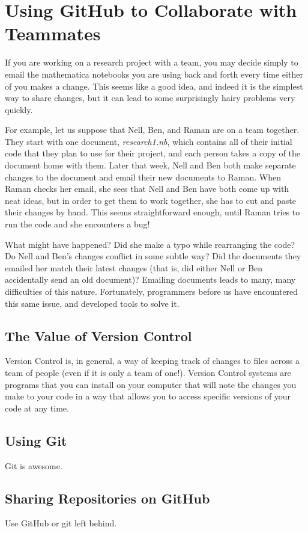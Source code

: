 \chapter{Using GitHub to Collaborate with Teammates}

If you are working on a research project with a team, you may decide simply to email the mathematica notebooks you are using back and forth every time either of you makes a change. This seems like a good idea, and indeed it is the simplest way to share changes, but it can lead to some surprisingly hairy problems very quickly.

For example, let us suppose that Nell, Ben, and Raman are on a team together. They start with one document, \emph{research1.nb}, which contains all of their initial code that they plan to use for their project, and each person takes a copy of the document home with them. Later that week, Nell and Ben both make separate changes to the document and email their new documents to Raman. When Raman checks her email, she sees that Nell and Ben have both come up with neat ideas, but in order to get them to work together, she has to cut and paste their changes by hand. This seems straightforward enough, until Raman tries to run the code and she encounters a bug!

What might have happened? Did she make a typo while rearranging the code? Do Nell and Ben's changes conflict in some subtle way? Did the documents they emailed her match their latest changes (that is, did either Nell or Ben accidentally send an old document)? Emailing documents leads to many, many difficulties of this nature. Fortunately, programmers before us have encountered this same issue, and developed tools to solve it.

\section{The Value of Version Control}

Version Control is, in general, a way of keeping track of changes to files across a team of people (even if it is only a team of one!). Version Control systems are programs that you can install on your computer that will note the changes you make to your code in a way that allows you to access specific versions of your code at any time.

\section{Using Git}

Git is awesome.

\section{Sharing Repositories on GitHub}

Use GitHub or git left behind.
